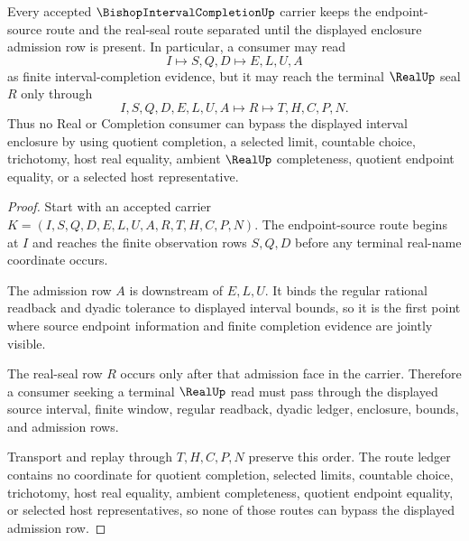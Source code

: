 \begin{theorem}
\label{thm:bishop-interval-completion-route-separation}
Every accepted $\BishopIntervalCompletionUp$ carrier keeps the endpoint-source route and the real-seal route separated until the displayed enclosure admission row is present. In particular, a consumer may read
$$
I \longmapsto S,Q,D \longmapsto E,L,U,A
$$
as finite interval-completion evidence, but it may reach the terminal $\RealUp$ seal $R$ only through
$$
I,S,Q,D,E,L,U,A \longmapsto R \longmapsto T,H,C,P,N .
$$
Thus no Real or Completion consumer can bypass the displayed interval enclosure by using quotient completion, a selected limit, countable choice, trichotomy, host real equality, ambient $\RealUp$ completeness, quotient endpoint equality, or a selected host representative.
\end{theorem}
\begin{proof}
Start with an accepted carrier $K=(I,S,Q,D,E,L,U,A,R,T,H,C,P,N)$. The endpoint-source route begins at $I$ and reaches the finite observation rows $S,Q,D$ before any terminal real-name coordinate occurs.

The admission row $A$ is downstream of $E,L,U$. It binds the regular rational readback and dyadic tolerance to displayed interval bounds, so it is the first point where source endpoint information and finite completion evidence are jointly visible.

The real-seal row $R$ occurs only after that admission face in the carrier. Therefore a consumer seeking a terminal $\RealUp$ read must pass through the displayed source interval, finite window, regular readback, dyadic ledger, enclosure, bounds, and admission rows.

Transport and replay through $T,H,C,P,N$ preserve this order. The route ledger contains no coordinate for quotient completion, selected limits, countable choice, trichotomy, host real equality, ambient completeness, quotient endpoint equality, or selected host representatives, so none of those routes can bypass the displayed admission row.
\end{proof}

